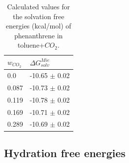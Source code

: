 \documentclass[final,12p,times,twocolumn]{elsarticle}
\begin{document}
	\begin{table}
		\centering
		\caption{Calculated values for the solvation free energies (kcal/mol) of phenanthrene in toluene+$CO_{2}$.}
		\label{tbl:solvco2}
		\begin{tabular}{ll}
			\hline\hline
			$w_{CO_{2}}$ & $\Delta G_{solv}^{Mie}$ \\ \hline
			0.0          & -10.65 $\pm$ 0.02       \\
			0.087        & -10.73 $\pm$ 0.02       \\
			0.119        & -10.78 $\pm$ 0.02       \\
			0.169        & -10.71 $\pm$ 0.02       \\
			0.289        & -10.69 $\pm$ 0.02       \\ \hline\hline
		\end{tabular}
	\end{table}
	
	\subsection{Hydration free energies}
	
\end{document}
